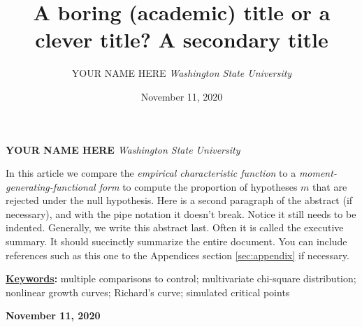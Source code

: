 \documentclass[]{article}
\title{\textbf{\textcolor{WSU.crimson}{A boring (academic) title or a
clever title?}} \newline \textbf{\textcolor{WSU.gray}{A secondary
title}}  }
\author{\Large YOUR NAME
HERE\vspace{0.05in} \newline\normalsize\emph{Washington State
University}  }
\date{November 11, 2020}
\newcommand*{\authorfont}{\fontfamily{phv}\selectfont}
\renewenvironment{abstract}
 {{%
    \setlength{\leftmargin}{0mm}
    \setlength{\rightmargin}{\leftmargin}%
  }%
  \relax}
 {\endlist}
\begin{document}
	
%    


{%
\setlength{\parindent}{0pt}
\thispagestyle{plain}
{\fontsize{18}{20}\selectfont\raggedright 
\maketitle  %

}

{
   \vskip 13.5pt\relax \normalsize\fontsize{11}{12} 
   
\textbf{\authorfont YOUR NAME HERE} \hskip 15pt \emph{\small Washington
State University}   

}

}








\begin{abstract}

    \hbox{\vrule height .2pt width 39.14pc}

    \vskip 8.5pt %

\noindent In this article we compare the
\emph{empirical characteristic function} \citep{Tukey:1977, Becker:1988}
to a \emph{moment-generating-functional form} to compute the proportion
of hypotheses \(m\) that are rejected under the null hypothesis.
\vspace{0.25in} \noindent Here is a second paragraph of the abstract (if
necessary), and with the pipe notation it doesn't break. Notice it still
needs to be indented. \vspace{0.25in} \noindent Generally, we write this
abstract last. Often it is called the executive summary. It should
succinctly summarize the entire document. You can include references
such as this one to the Appendices section \ref{sec:appendix} if
necessary.


\vskip 8.5pt \noindent \textbf{\underline{Keywords}:} multiple
comparisons to control; multivariate chi-square distribution; nonlinear
growth curves; Richard's curve; simulated critical points \par

    




    
    \hbox{\vrule height .2pt width 39.14pc}
    \vskip 5pt 
    \hfill \textbf{\textcolor{WSU.gray}{ November 11, 2020 } }
    \vskip 5pt 
    
\end{abstract}
\end{document}
